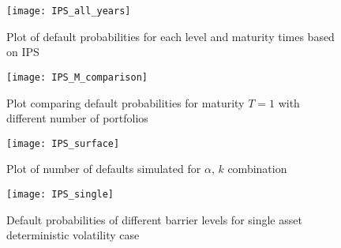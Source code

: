 \begin{figure}
    \centering
    \texttt{[image: IPS\_all\_years]}
    \caption{Plot of default probabilities for each level and maturity times
    based on IPS}
    \label{fig:IPS_all}
\end{figure}

\begin{figure}
    \centering
    \texttt{[image: IPS\_M\_comparison]}
    \caption{Plot comparing default probabilities for maturity $T=1$ with
        different number of portfolios}
    \label{fig:IPS_comparison}
\end{figure}

\begin{figure}
    \centering
    \texttt{[image: IPS\_surface]}
    \caption{Plot of number of defaults simulated for $\alpha$, $k$ combination}
    \label{fig:IPS_surface}
\end{figure}

\begin{figure}
\centering
\texttt{[image: IPS\_single]}
\caption{Default probabilities of different barrier levels for single asset
    deterministic volatility case}
\label{fig:IPS_single}
\end{figure}
